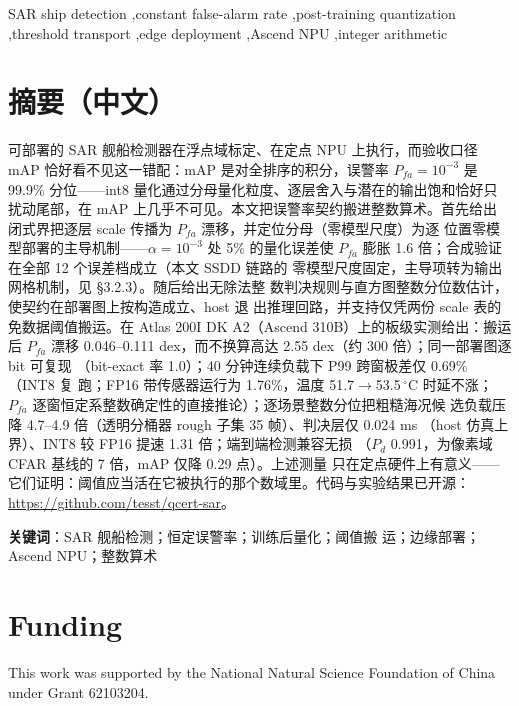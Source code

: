 \documentclass[preprint,12pt]{elsarticle}
\begin{document}
\begin{frontmatter}
\begin{keyword}
SAR ship detection \sep constant false-alarm rate \sep post-training
quantization \sep threshold transport \sep edge deployment \sep Ascend NPU
\sep integer arithmetic
\end{keyword}

\end{frontmatter}

\section*{摘要（中文）}
可部署的 SAR 舰船检测器在浮点域标定、在定点 NPU 上执行，而验收口径 mAP
恰好看不见这一错配：mAP 是对全排序的积分，误警率 $P_{fa}=10^{-3}$ 是
99.9\% 分位——int8 量化通过分母量化粒度、逐层舍入与潜在的输出饱和恰好只
扰动尾部，在 mAP 上几乎不可见。本文把误警率契约搬进整数算术。首先给出
闭式界把逐层 scale 传播为 $P_{fa}$ 漂移，并定位分母（零模型尺度）为逐
位置零模型部署的主导机制——$\alpha=10^{-3}$ 处 5\% 的量化误差使
$P_{fa}$ 膨胀 1.6 倍；合成验证在全部 12 个误差档成立（本文 SSDD 链路的
零模型尺度固定，主导项转为输出网格机制，见 \S3.2.3）。随后给出无除法整
数判决规则与直方图整数分位数估计，使契约在部署图上按构造成立、host 退
出推理回路，并支持仅凭两份 scale 表的免数据阈值搬运。在 Atlas 200I DK
A2（Ascend 310B）上的板级实测给出：搬运后 $P_{fa}$ 漂移 0.046--0.111
dex，而不换算高达 2.55 dex（约 300 倍）；同一部署图逐 bit 可复现
（bit-exact 率 1.0）；40 分钟连续负载下 P99 跨窗极差仅 0.69\%（INT8 复
跑；FP16 带传感器运行为 1.76\%，温度 51.7$\to$53.5\,$^\circ$C 时延不涨；
$P_{fa}$ 逐窗恒定系整数确定性的直接推论）；逐场景整数分位把粗糙海况候
选负载压降 4.7--4.9 倍（透明分桶器 rough 子集 35 帧）、判决层仅 0.024 ms
（host 仿真上界）、INT8 较 FP16 提速 1.31 倍；端到端检测兼容无损
（$P_d$ 0.991，为像素域 CFAR 基线的 7 倍，mAP 仅降 0.29 点）。上述测量
只在定点硬件上有意义——它们证明：阈值应当活在它被执行的那个数域里。代码与实验结果已开源：\url{https://github.com/tesst/qcert-sar}。

\medskip
\noindent\textbf{关键词}：SAR 舰船检测；恒定误警率；训练后量化；阈值搬
运；边缘部署；Ascend NPU；整数算术

\bigskip



\section*{Funding}
This work was supported by the National Natural Science Foundation of China under Grant 62103204.
\end{document}
